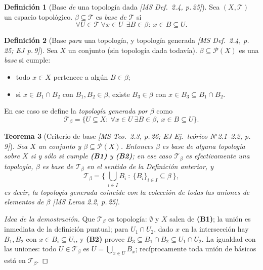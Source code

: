 \documentclass[11pt,a4paper]{article}
\newenvironment{lista}{\leavevmode\begin{itemize}[leftmargin=1.5em,itemsep=1pt,topsep=2pt,parsep=0pt]}{\end{itemize}}
\theoremstyle{definition}
\newtheorem{definicion}{Definición}[section]
\theoremstyle{plain}
\newtheorem{teorema}[definicion]{Teorema}
\newcommand{\fnt}[1]{{\normalfont\small\itshape\color{gray!150!black}[#1]}}
\newcommand{\tp}{\mathcal{T}}
\begin{document}
\begin{definicion}[Base \emph{de} una topología dada \fnt{MS Def.\ 2.4, p.\,25}]
Sea $(X,\tp)$ un espacio topológico. $\beta\subseteq\tp$ es \emph{base de} $\tp$ si
\[
\forall U\in\tp\ \forall x\in U\ \ \exists B\in\beta:\ x\in B\subseteq U .
\]
\end{definicion}

\begin{definicion}[Base \emph{para} una topología, y topología generada \fnt{MS Def.\ 2.4, p.\,25; EJ p.\,9}]
Sea $X$ un conjunto (sin topología dada todavía). $\beta\subseteq\mathcal P(X)$ es una \emph{base} si cumple:
\begin{lista}
\item[\textbf{(B1)}] todo $x\in X$ pertenece a algún $B\in\beta$;
\item[\textbf{(B2)}] si $x\in B_1\cap B_2$ con $B_1,B_2\in\beta$, existe $B_3\in\beta$ con $x\in B_3\subseteq B_1\cap B_2$.
\end{lista}
En ese caso se define la \emph{topología generada por} $\beta$ como
\[
\tp_\beta=\{U\subseteq X:\ \forall x\in U\ \exists B\in\beta,\ x\in B\subseteq U\}.
\]
\end{definicion}

\begin{teorema}[Criterio de base \fnt{MS Teo.\ 2.3, p.\,26; EJ Ej.\ teórico N$^\circ$2.1--2.2, p.\,9}]
Sea $X$ un conjunto y $\beta\subseteq\mathcal P(X)$. Entonces $\beta$ es base de alguna topología sobre $X$ si y sólo si cumple \textbf{(B1)} y \textbf{(B2)}; en ese caso $\tp_\beta$ es efectivamente una topología, $\beta$ es base de $\tp_\beta$ en el sentido de la Definición anterior, y
\[
\tp_\beta=\Big\{\ \bigcup_{i\in I}B_i\ :\ \{B_i\}_{i\in I}\subseteq\beta\ \Big\},
\]
es decir, la topología generada coincide con la colección de todas las uniones de elementos de $\beta$ \fnt{MS Lema 2.2, p.\,25}.
\end{teorema}

\begin{proof}[Idea de la demostración]
Que $\tp_\beta$ es topología: $\emptyset$ y $X$ salen de \textbf{(B1)}; la unión es inmediata de la definición puntual; para $U_1\cap U_2$, dado $x$ en la intersección hay $B_1,B_2$ con $x\in B_i\subseteq U_i$, y \textbf{(B2)} provee $B_3\subseteq B_1\cap B_2\subseteq U_1\cap U_2$. La igualdad con las uniones: todo $U\in\tp_\beta$ es $U=\bigcup_{x\in U}B_x$; recíprocamente toda unión de básicos está en $\tp_\beta$.
\end{proof}
\end{document}
